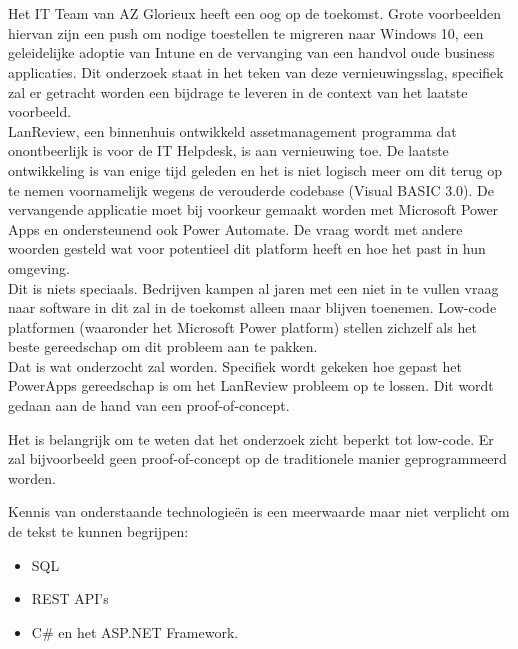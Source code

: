 
\chapter{}
\label{ch:inleiding}

Het IT Team van AZ Glorieux heeft een oog op de toekomst. Grote voorbeelden hiervan zijn een push om nodige toestellen te migreren naar Windows 10, een geleidelijke adoptie van Intune en de vervanging van een handvol oude business applicaties. Dit onderzoek staat in het teken van deze vernieuwingsslag, specifiek zal er getracht worden een bijdrage te leveren in de context van het laatste voorbeeld.\\
LanReview, een binnenhuis ontwikkeld assetmanagement programma dat onontbeerlijk is voor de IT Helpdesk, is aan vernieuwing toe. De laatste ontwikkeling is van enige tijd geleden en het is niet logisch meer om dit terug op te nemen voornamelijk wegens de verouderde codebase (Visual BASIC 3.0). De vervangende applicatie moet bij voorkeur gemaakt worden met Microsoft Power Apps en ondersteunend ook Power Automate. De vraag wordt met andere woorden gesteld wat voor potentieel dit platform heeft en hoe het past in hun omgeving.\\
Dit is niets speciaals. Bedrijven kampen al jaren met een niet in te vullen vraag naar software in dit zal in de toekomst alleen maar blijven toenemen. Low-code platformen (waaronder het Microsoft Power platform) stellen zichzelf als het beste gereedschap om dit probleem aan te pakken.\\
Dat is wat onderzocht zal worden. Specifiek wordt gekeken hoe gepast het PowerApps gereedschap is om het LanReview probleem op te lossen. Dit wordt gedaan aan de hand van een proof-of-concept.

Het is belangrijk om te weten dat het onderzoek zicht beperkt tot low-code. Er zal bijvoorbeeld geen proof-of-concept op de traditionele manier geprogrammeerd worden.

Kennis van onderstaande technologieën is een meerwaarde maar niet verplicht om de tekst te kunnen begrijpen:
\begin{itemize}
    \item SQL
    \item REST API's
    \item C\# en het ASP.NET Framework.
\end{itemize}

